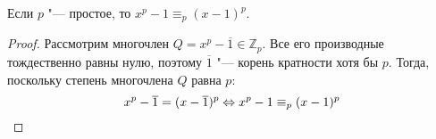 \begin{corollary}
	Если $p$ "--- простое, то $x^p - 1 \equiv_p (x - 1)^p$.
\end{corollary}

\begin{proof}
	Рассмотрим многочлен $Q = x^p - \overline{1} \in \mathbb{Z}_p$. Все его производные тождественно равны нулю, поэтому $\overline{1}$ "--- корень кратности хотя бы $p$. Тогда, поскольку степень многочлена $Q$ равна $p$:
	\[x^p - \overline{1} = (x - \overline{1})^p \Leftrightarrow x^p - 1 \equiv_p (x - 1)^p\qedhere\]
\end{proof}